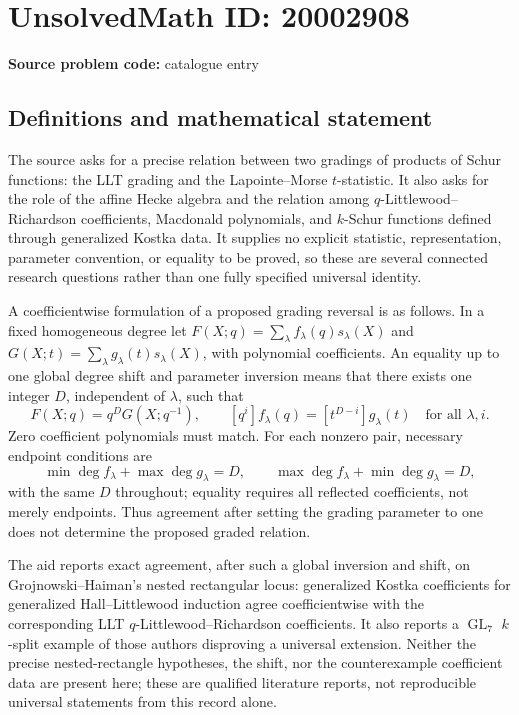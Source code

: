\documentclass[11pt]{article}
\begin{document}
\section*{UnsolvedMath ID: 20002908}
\textbf{Source problem code:} catalogue entry
\subsection{Definitions and mathematical statement}
The source asks for a precise relation between two gradings of products of Schur functions: the LLT grading and the Lapointe--Morse $t$-statistic. It also asks for the role of the affine Hecke algebra and the relation among $q$-Littlewood--Richardson coefficients, Macdonald polynomials, and $k$-Schur functions defined through generalized Kostka data. It supplies no explicit statistic, representation, parameter convention, or equality to be proved, so these are several connected research questions rather than one fully specified universal identity.

A coefficientwise formulation of a proposed grading reversal is as follows. In a fixed homogeneous degree let $F(X;q)=\sum_\lambda f_\lambda(q)s_\lambda(X)$ and $G(X;t)=\sum_\lambda g_\lambda(t)s_\lambda(X)$, with polynomial coefficients. An equality up to one global degree shift and parameter inversion means that there exists one integer $D$, independent of $\lambda$, such that
\[
F(X;q)=q^D G(X;q^{-1}),\qquad
[q^i]f_\lambda(q)=[t^{D-i}]g_\lambda(t)\quad\text{for all }\lambda,i.
\]
Zero coefficient polynomials must match. For each nonzero pair, necessary endpoint conditions are
\[
\min\deg f_\lambda+\max\deg g_\lambda=D,
\qquad \max\deg f_\lambda+\min\deg g_\lambda=D,
\]
with the same $D$ throughout; equality requires all reflected coefficients, not merely endpoints. Thus agreement after setting the grading parameter to one does not determine the proposed graded relation.

The aid reports exact agreement, after such a global inversion and shift, on Grojnowski--Haiman's nested rectangular locus: generalized Kostka coefficients for generalized Hall--Littlewood induction agree coefficientwise with the corresponding LLT $q$-Littlewood--Richardson coefficients. It also reports a $\operatorname{GL}_7$ $k$-split example of those authors disproving a universal extension. Neither the precise nested-rectangle hypotheses, the shift, nor the counterexample coefficient data are present here; these are qualified literature reports, not reproducible universal statements from this record alone.
\end{document}
